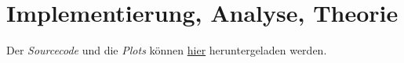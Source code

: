 \section{Implementierung, Analyse, Theorie}


Der \textit{Sourcecode} und die \textit{Plots} können	
\href{https://mega.nz/file/bowz1LKI#tDlsZ7LHBZ6MK9DjTzWtL8-S2_UOX0dAR_qNlt2cmoU}
{hier}
heruntergeladen werden.

